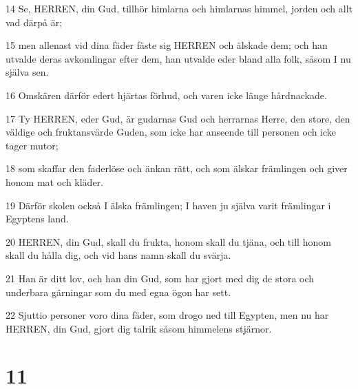 \par 14 Se, HERREN, din Gud, tillhör himlarna och himlarnas himmel, jorden och allt vad därpå är;
\par 15 men allenast vid dina fäder fäste sig HERREN och älskade dem; och han utvalde deras avkomlingar efter dem, han utvalde eder bland alla folk, såsom I nu själva sen.
\par 16 Omskären därför edert hjärtas förhud, och varen icke länge hårdnackade.
\par 17 Ty HERREN, eder Gud, är gudarnas Gud och herrarnas Herre, den store, den väldige och fruktansvärde Guden, som icke har anseende till personen och icke tager mutor;
\par 18 som skaffar den faderlöse och änkan rätt, och som älskar främlingen och giver honom mat och kläder.
\par 19 Därför skolen också I älska främlingen; I haven ju själva varit främlingar i Egyptens land.
\par 20 HERREN, din Gud, skall du frukta, honom skall du tjäna, och till honom skall du hålla dig, och vid hans namn skall du svärja.
\par 21 Han är ditt lov, och han din Gud, som har gjort med dig de stora och underbara gärningar som du med egna ögon har sett.
\par 22 Sjuttio personer voro dina fäder, som drogo ned till Egypten, men nu har HERREN, din Gud, gjort dig talrik såsom himmelens stjärnor.

\chapter{11}

